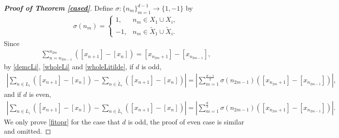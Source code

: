 \documentclass[12pt]{amsart}
\newcommand{\abs}[1]{\left\lvert #1 \right\rvert}
\theoremstyle{plain}
\theoremstyle{definition}
\begin{document}
\begin{proof}[\textbf{Proof of Theorem \ref{cased}}]
Define $\sigma:\{n_m\}_{m=1}^{d-1}\to \{1,-1\}$ by
\begin{align}
\sigma(n_m)=\begin{cases}
1, &n_m\in X_1\cup X_i,\\
-1, &n_m\in \tilde{X}_1\cup \tilde{X}_i.
\end{cases}\nonumber
\end{align}
Since 
\begin{align}
\sum_{n=n_{2m-1}}^{n_{2m}}(\left[x_{n+1}\right]-\left[x_n\right])=\left[x_{n_{2m}+1}\right]-\left[x_{n_{2m-1}}\right],\nonumber
\end{align}
by \eqref{demcLi}, \eqref{wholeLi} and \eqref{wholeLitilde}, if $d$ is odd,
\begin{align}
	\abs{\sum_{n\in L_i}(\left[x_{n+1}\right]-\left[x_n\right])-\sum_{n\in \tilde{L}_i}(\left[x_{n+1}\right]-\left[x_n\right])}
	=\abs{\sum_{m=1}^{\frac{d-1}{2}}\sigma(n_{2m-1})(\left[x_{n_{2m}+1}\right]-\left[x_{n_{2m-1}}\right])},\label{transition}
\end{align}
and if $d$ is even,
\begin{align}
	\abs{\sum_{n\in L_i}(\left[x_{n+1}\right]-\left[x_n\right])-\sum_{n\in \tilde{L}_i}(\left[x_{n+1}\right]-\left[x_n\right])}
	=\abs{\sum_{m=1}^{\frac{d}{2}}\sigma(n_{2m-1})(\left[x_{n_{2m}+1}\right]-\left[x_{n_{2m-1}}\right])}.\nonumber
\end{align}
We only prove \eqref{fitopr} for the case that $d$ is odd, the proof of even case is similar and omitted.




\end{proof}
\end{document}
